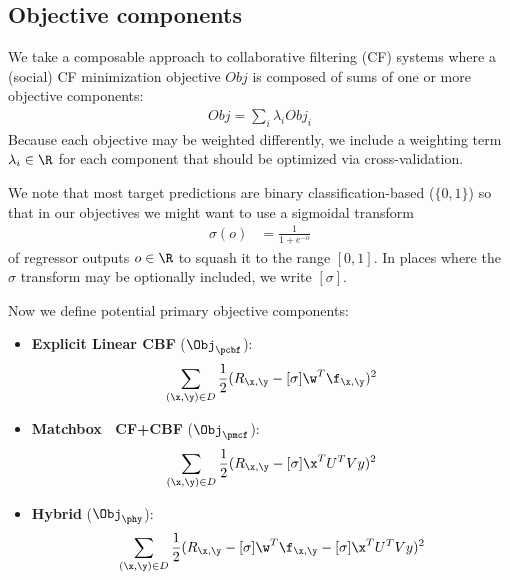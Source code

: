 \subsection{Objective components}

\label{sec:obj_comp}

We take a composable approach to collaborative filtering (CF) systems
where a (social) CF minimization 
objective $\mathit{Obj}$ is composed of sums of one or more
objective components:
\begin{align}
\mathit{Obj} = \sum_i \lambda_i \mathit{Obj}_i
\end{align}
Because each objective may be weighted differently, we include a 
weighting term $\lambda_i \in \R$ for each component that should be
optimized via cross-validation.

We note that most target predictions are binary 
classification-based ($\{0,1\}$)
so that in our objectives we might want to use a sigmoidal transform 
\begin{align}
\sigma(o) & = \frac{1}{1 + e^{-o}}
\end{align}
of regressor outputs $o \in \R$ to squash it 
to the range $[0, 1]$.  
In places where the $\sigma$ transform may be optionally included, 
we write $[\sigma]$.  

Now we define potential primary objective components:
\begin{itemize}
\item {\bf Explicit Linear CBF} ($\Obj_\pcbf$):
\begin{align}
\sum_{(\x,\y) \in D} \frac{1}{2} (R_{\x,\y} - [\sigma] \w^T \f_{\x,\y})^2
\end{align}
\item {\bf Matchbox~\cite{matchbox} CF+CBF} ($\Obj_\pmcf$):
\begin{align}
\sum_{(\x,\y) \in D} \frac{1}{2} (R_{\x,\y} - [\sigma] \x^T U^T V y)^2
\end{align}
\item {\bf Hybrid} ($\Obj_\phy$):
\begin{align}
\sum_{(\x,\y) \in D} \frac{1}{2} (R_{\x,\y} - [\sigma] \w^T \f_{\x,\y} - [\sigma] \x^T U^T V y)^2
\end{align}
\end{itemize}

